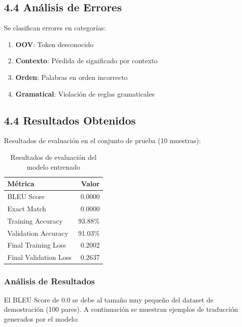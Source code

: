 \documentclass[12pt,a4paper]{article}
\begin{document}
\subsection{4.4 Análisis de Errores}

Se clasifican errores en categorías:
\begin{enumerate}
    \item \textbf{OOV}: Token desconocido
    \item \textbf{Contexto}: Pérdida de significado por contexto
    \item \textbf{Orden}: Palabras en orden incorrecto
    \item \textbf{Gramatical}: Violación de reglas gramaticales
\end{enumerate}

\subsection{4.4 Resultados Obtenidos}

Resultados de evaluación en el conjunto de prueba (10 muestras):

\begin{table}[H]
    \centering
    \begin{tabular}{lr}
        \toprule
        \textbf{Métrica} & \textbf{Valor} \\
        \midrule
        BLEU Score & 0.0000 \\
        Exact Match & 0.0000 \\
        Training Accuracy & 93.88\% \\
        Validation Accuracy & 91.03\% \\
        Final Training Loss & 0.2002 \\
        Final Validation Loss & 0.2637 \\
        \bottomrule
    \end{tabular}
    \caption{Resultados de evaluación del modelo entrenado}
\end{table}

\subsubsection{Análisis de Resultados}

El BLEU Score de 0.0 se debe al tamaño muy pequeño del dataset de demostración (100 pares). A continuación se muestran ejemplos de traducción generados por el modelo:
\end{document}
